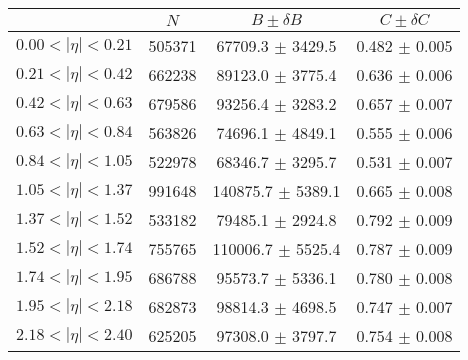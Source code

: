\begin{tabular}{lccc}
\hline
    &   $N$   & $B \pm \delta B$  &  $C \pm \delta C$ \\
\hline
$0.00 < |\eta| <0.21$          & 505371     & 67709.3    $\pm$ 3429.5 & 0.482      $\pm$ 0.005 \\
$0.21 < |\eta| <0.42$          & 662238     & 89123.0    $\pm$ 3775.4 & 0.636      $\pm$ 0.006 \\
$0.42 < |\eta| <0.63$          & 679586     & 93256.4    $\pm$ 3283.2 & 0.657      $\pm$ 0.007 \\
$0.63 < |\eta| <0.84$          & 563826     & 74696.1    $\pm$ 4849.1 & 0.555      $\pm$ 0.006 \\
$0.84 < |\eta| <1.05$          & 522978     & 68346.7    $\pm$ 3295.7 & 0.531      $\pm$ 0.007 \\
$1.05 < |\eta| <1.37$          & 991648     & 140875.7   $\pm$ 5389.1 & 0.665      $\pm$ 0.008 \\
$1.37 < |\eta| <1.52$          & 533182     & 79485.1    $\pm$ 2924.8 & 0.792      $\pm$ 0.009 \\
$1.52 < |\eta| <1.74$          & 755765     & 110006.7   $\pm$ 5525.4 & 0.787      $\pm$ 0.009 \\
$1.74 < |\eta| <1.95$          & 686788     & 95573.7    $\pm$ 5336.1 & 0.780      $\pm$ 0.008 \\
$1.95 < |\eta| <2.18$          & 682873     & 98814.3    $\pm$ 4698.5 & 0.747      $\pm$ 0.007 \\
$2.18 < |\eta| <2.40$          & 625205     & 97308.0    $\pm$ 3797.7 & 0.754      $\pm$ 0.008 \\
\hline
\end{tabular}
